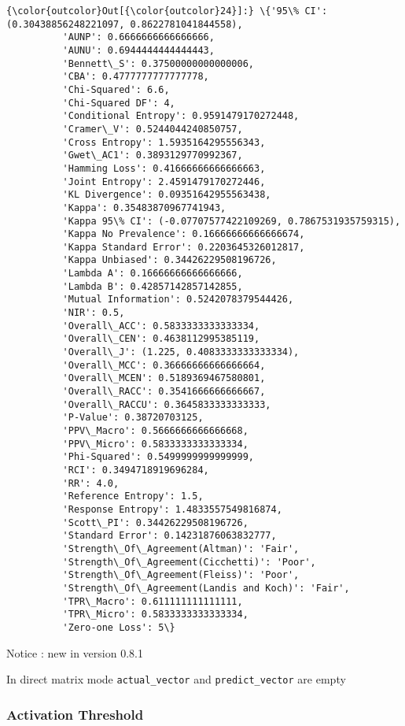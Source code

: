 \documentclass[11pt]{article}
\begin{document}
\begin{Verbatim}[commandchars=\\\{\}]
{\color{outcolor}Out[{\color{outcolor}24}]:} \{'95\% CI': (0.30438856248221097, 0.8622781041844558),
          'AUNP': 0.6666666666666666,
          'AUNU': 0.6944444444444443,
          'Bennett\_S': 0.37500000000000006,
          'CBA': 0.4777777777777778,
          'Chi-Squared': 6.6,
          'Chi-Squared DF': 4,
          'Conditional Entropy': 0.9591479170272448,
          'Cramer\_V': 0.5244044240850757,
          'Cross Entropy': 1.5935164295556343,
          'Gwet\_AC1': 0.3893129770992367,
          'Hamming Loss': 0.41666666666666663,
          'Joint Entropy': 2.4591479170272446,
          'KL Divergence': 0.09351642955563438,
          'Kappa': 0.35483870967741943,
          'Kappa 95\% CI': (-0.07707577422109269, 0.7867531935759315),
          'Kappa No Prevalence': 0.16666666666666674,
          'Kappa Standard Error': 0.2203645326012817,
          'Kappa Unbiased': 0.34426229508196726,
          'Lambda A': 0.16666666666666666,
          'Lambda B': 0.42857142857142855,
          'Mutual Information': 0.5242078379544426,
          'NIR': 0.5,
          'Overall\_ACC': 0.5833333333333334,
          'Overall\_CEN': 0.4638112995385119,
          'Overall\_J': (1.225, 0.4083333333333334),
          'Overall\_MCC': 0.36666666666666664,
          'Overall\_MCEN': 0.5189369467580801,
          'Overall\_RACC': 0.3541666666666667,
          'Overall\_RACCU': 0.3645833333333333,
          'P-Value': 0.38720703125,
          'PPV\_Macro': 0.5666666666666668,
          'PPV\_Micro': 0.5833333333333334,
          'Phi-Squared': 0.5499999999999999,
          'RCI': 0.3494718919696284,
          'RR': 4.0,
          'Reference Entropy': 1.5,
          'Response Entropy': 1.4833557549816874,
          'Scott\_PI': 0.34426229508196726,
          'Standard Error': 0.14231876063832777,
          'Strength\_Of\_Agreement(Altman)': 'Fair',
          'Strength\_Of\_Agreement(Cicchetti)': 'Poor',
          'Strength\_Of\_Agreement(Fleiss)': 'Poor',
          'Strength\_Of\_Agreement(Landis and Koch)': 'Fair',
          'TPR\_Macro': 0.611111111111111,
          'TPR\_Micro': 0.5833333333333334,
          'Zero-one Loss': 5\}
\end{Verbatim}
            
    {Notice } : new in {version 0.8.1}

In direct matrix mode \texttt{actual\_vector} and
\texttt{predict\_vector} are empty

    \hypertarget{activation-threshold}{%
\subsubsection{Activation Threshold}\label{activation-threshold}}
\end{document}
